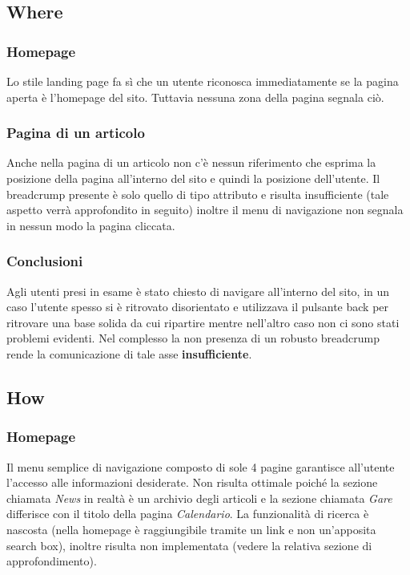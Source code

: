 		
	\subsection{Where}
	
		\subsubsection{Homepage}
			Lo stile landing page fa sì che un utente riconosca immediatamente se la pagina aperta è l'homepage del sito. Tuttavia nessuna zona della pagina segnala ciò.	
		
		\subsubsection{Pagina di un articolo}
			Anche nella pagina di un articolo non c'è nessun riferimento che esprima la posizione della pagina all'interno del sito e quindi la posizione dell'utente. Il breadcrump presente è solo quello di tipo attributo e risulta insufficiente (tale aspetto verrà approfondito in seguito) inoltre il menu di navigazione non segnala in nessun modo la pagina cliccata.
			
		\subsubsection{Conclusioni}
			Agli utenti presi in esame è stato chiesto di navigare all'interno del sito, in un caso l'utente spesso si è ritrovato disorientato e utilizzava il pulsante back per ritrovare una base solida da cui ripartire mentre nell'altro caso non ci sono stati problemi evidenti. Nel complesso la non presenza di un robusto breadcrump rende la comunicazione di tale asse \textbf{insufficiente}.
		
	\subsection{How}
		
		\subsubsection{Homepage}
			Il menu semplice di navigazione composto di sole 4 pagine garantisce all'utente l'accesso alle informazioni desiderate. Non risulta ottimale poiché la sezione chiamata \textit{News} in realtà è un archivio degli articoli e la sezione chiamata \textit{Gare} differisce con il titolo della pagina \textit{Calendario}. La funzionalità di ricerca è nascosta (nella homepage è raggiungibile tramite un link e non un'apposita search box), inoltre risulta non implementata (vedere la relativa sezione di approfondimento).
		

